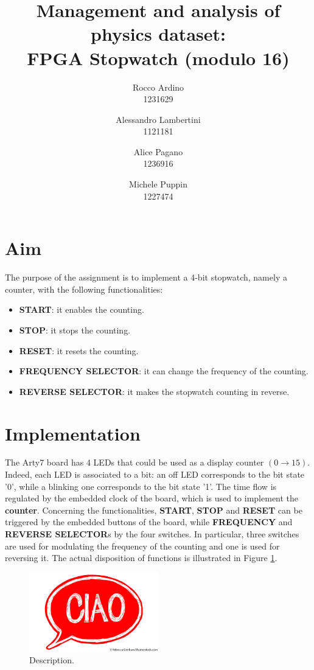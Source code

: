 \documentclass[11pt, a4paper]{article}
\begin{document}
\author{Rocco Ardino\\1231629  \and Alessandro Lambertini\\1121181 \and Alice Pagano \\1236916 \and Michele Puppin \\ 1227474}
\title{\textbf{Management and analysis of physics dataset: \\ FPGA  Stopwatch (modulo 16)}}
\maketitle

\section{Aim}
The purpose of the assignment is to implement a 4-bit stopwatch, namely a counter, with the following functionalities:
\begin{itemize}
\item \textbf{START}: it enables the counting.
\item \textbf{STOP}: it stops the counting.
\item \textbf{RESET}: it resets the counting.
\item \textbf{FREQUENCY SELECTOR}: it can change the frequency of the counting.
\item \textbf{REVERSE SELECTOR}: it makes the stopwatch counting in reverse.
\end{itemize}

\section{Implementation}
The Arty7 board has 4 LEDs that could be used as a display counter \( (0 \rightarrow 15) \). Indeed, each LED is associated to a bit: an off LED corresponds to the bit state '0', while a blinking one corresponds to the bit state '1'. The time flow is regulated by the embedded clock of the board, which is used to implement the \textbf{counter}.
Concerning the functionalities, \textbf{START}, \textbf{STOP} and \textbf{RESET} can be triggered by the embedded buttons of the board, while \textbf{FREQUENCY} and \textbf{REVERSE SELECTOR}s by the four switches. In particular, three switches are used for modulating the frequency of the counting and one is used for reversing it. The actual disposition of functions is illustrated in Figure \ref{fig:board_implementation}.

\begin{figure}[h!]
\centering
\includegraphics[width=0.5\textwidth]{../main/image/ciao.jpg}
\caption{\label{fig:board_implementation} Description.}
\end{figure}
\end{document}
